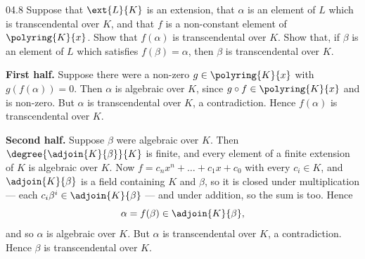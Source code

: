 \documentclass[11pt]{article}
\begin{document}
\begin{problem}{04.8}
  Suppose that $\ext{L}{K}$ is an extension, that $\alpha$ is an element of
  $L$ which is transcendental over $K$, and that $f$ is a non-constant element
  of $\polyring{K}{x}$. Show that $f(\alpha)$ is transcendental over $K$. Show
  that, if $\beta$ is an element of $L$ which satisfies $f(\beta) = \alpha$,
  then $\beta$ is transcendental over $K$.
\end{problem}
\begin{solution}
  \textbf{First half.} Suppose there were a non-zero $g \in \polyring{K}{x}$
  with $g(f(\alpha)) = 0$. Then $\alpha$ is algebraic over $K$, since
  $g \circ f \in \polyring{K}{x}$ and is non-zero. But $\alpha$ is
  transcendental over $K$, a contradiction. Hence $f(\alpha)$ is transcendental
  over $K$.

  \medskip
  \textbf{Second half.} Suppose $\beta$ were algebraic over $K$. Then
  $\degree{\adjoin{K}{\beta}}{K}$ is finite, and every element of a finite
  extension of $K$ is algebraic over $K$. Now
  $f = c_{n}x^{n} + \dots + c_{1}x + c_{0}$ with every $c_{i} \in K$, and
  $\adjoin{K}{\beta}$ is a field containing $K$ and $\beta$, so it is closed
  under multiplication --- each $c_{i}\beta^{i} \in \adjoin{K}{\beta}$ --- and
  under addition, so the sum is too. Hence
  \[
    \alpha = f(\beta) \in \adjoin{K}{\beta},
  \]
  and so $\alpha$ is algebraic over $K$. But $\alpha$ is transcendental over
  $K$, a contradiction. Hence $\beta$ is transcendental over $K$.
\end{solution}
\end{document}

